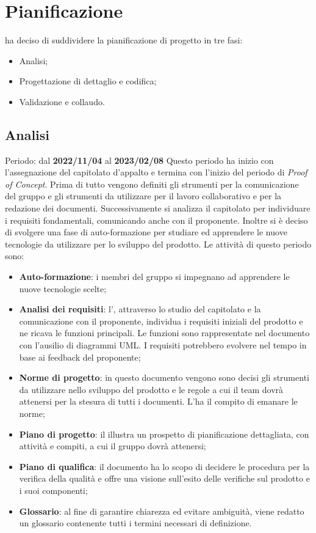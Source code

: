 \section{Pianificazione}
\groupName\:ha deciso di suddividere la pianificazione di progetto in tre fasi:
\begin{itemize}
    \item Analisi;
    \item Progettazione di dettaglio e codifica;
    \item Validazione e collaudo.
\end{itemize}

\subsection{Analisi}
Periodo: dal \textbf{2022/11/04} al \textbf{2023/02/08} \newline
Questo periodo ha inizio con l'assegnazione del capitolato d'appalto e termina con l'inizio del periodo di \textit{Proof of Concept}\glo.
Prima di tutto vengono definiti gli strumenti per la comunicazione del gruppo e gli strumenti da utilizzare per il lavoro collaborativo e
per la redazione dei documenti. Successivamente si analizza il capitolato per individuare i requisiti fondamentali, comunicando anche con
il proponente.
Inoltre si è deciso di svolgere una fase di auto-formazione per studiare ed apprendere le nuove tecnologie da utilizzare per lo sviluppo del prodotto.
Le attività di questo periodo sono:
\begin{itemize}
    \item \textbf{Auto-formazione}: i membri del gruppo si impegnano ad apprendere le nuove tecnologie scelte;
    \item \textbf{Analisi dei requisiti}: l'\roleAnalyst, attraverso lo studio del capitolato e la comunicazione con il proponente,
          individua i requisiti iniziali del prodotto e ne ricava le funzioni principali. Le funzioni sono rappresentate nel documento
          con l'ausilio di diagrammi UML\glo . I requisiti potrebbero evolvere nel tempo in base ai feedback del proponente;
    \item \textbf{Norme di progetto}: in questo documento vengono sono decisi gli strumenti da utilizzare nello sviluppo del prodotto
          e le regole a cui il team dovrà attenersi per la stesura di tutti i documenti. L'\roleAdministrator\:ha il compito di emanare
          le norme;
    \item \textbf{Piano di progetto}: il \roleProjectManager\:illustra un prospetto di pianificazione dettagliata, con attività e compiti,
          a cui il gruppo dovrà attenersi;
    \item \textbf{Piano di qualifica}: il documento ha lo scopo di decidere le procedura per la verifica della qualità e
          offre una visione sull'esito delle verifiche sul prodotto e i suoi componenti;
    \item \textbf{Glossario}: al fine di garantire chiarezza ed evitare ambiguità, viene redatto un glossario contenente tutti i termini necessari di definizione.
\end{itemize}
